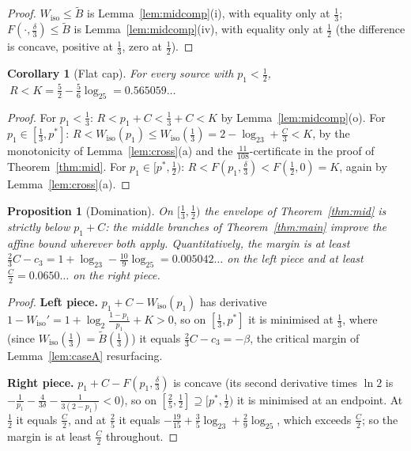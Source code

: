 \documentclass[journal]{IEEEtran}
\newtheorem{proposition}{Proposition}
\newtheorem{corollary}{Corollary}
\theoremstyle{definition}
\newcommand{\lgg}{\log_2}
\newcommand{\CC}{C}
\newcommand{\cthree}{c_3}
\begin{document}
\begin{proof}
$W_{\mathrm{iso}}\le\tilde B$ is Lemma~\ref{lem:midcomp}(i), with equality
only at $\tfrac13$; $F(\cdot,\tfrac\delta3)\le\tilde B$ is
Lemma~\ref{lem:midcomp}(iv), with equality only at $\tfrac12$ (the difference
is concave, positive at $\tfrac13$, zero at $\tfrac12$).
\end{proof}

\begin{corollary}[Flat cap]\label{cor:kcap}
For every source with $p_1<\tfrac12$,
$\ R<K=\tfrac52-\tfrac56\lgg5=0.565059\ldots$
\end{corollary}

\begin{proof}
For $p_1<\tfrac13$: $R<p_1+\CC<\tfrac13+\CC<K$ by
Lemma~\ref{lem:midcomp}(o). For $p_1\in[\tfrac13,p^*]$:
$R<W_{\mathrm{iso}}(p_1)\le W_{\mathrm{iso}}(\tfrac13)
=2-\lgg3+\tfrac{\CC}3<K$, by the monotonicity of
Lemma~\ref{lem:cross}(a) and the $\tfrac{11}{108}$-certificate in the proof
of Theorem~\ref{thm:mid}. For $p_1\in[p^*,\tfrac12)$:
$R<F(p_1,\tfrac\delta3)<F(\tfrac12,0)=K$, again by
Lemma~\ref{lem:cross}(a).
\end{proof}

\begin{proposition}[Domination]\label{prop:dom}
On $[\tfrac13,\tfrac12)$ the envelope of Theorem~\ref{thm:mid} is strictly
below $p_1+\CC$: the middle branches of Theorem~\ref{thm:main} improve the
affine bound wherever both apply. Quantitatively, the margin is at least
$\tfrac23\CC-\cthree=1+\lgg3-\tfrac{10}9\lgg5=0.005042\ldots$ on the left
piece and at least $\tfrac{\CC}2=0.0650\ldots$ on the right piece.
\end{proposition}

\begin{proof}
\textbf{Left piece.} $p_1+\CC-W_{\mathrm{iso}}(p_1)$ has derivative
$1-W_{\mathrm{iso}}'=1+\lgg\tfrac{1-p_1}{p_1}+K>0$, so on $[\tfrac13,p^*]$ it
is minimised at $\tfrac13$, where (since
$W_{\mathrm{iso}}(\tfrac13)=\tilde B(\tfrac13)$) it equals
$\tfrac23\CC-\cthree=-\beta$, the critical margin of Lemma~\ref{lem:caseA}
resurfacing.

\textbf{Right piece.} $p_1+\CC-F(p_1,\tfrac\delta3)$ is concave (its second
derivative times $\ln2$ is $-\tfrac1{p_1}-\tfrac4{3\delta}
-\tfrac1{3(2-p_1)}<0$), so on $[\tfrac25,\tfrac12]\supseteq[p^*,\tfrac12)$ it
is minimised at an endpoint. At $\tfrac12$ it equals $\tfrac{\CC}2$, and at
$\tfrac25$ it equals $-\tfrac{19}{15}+\tfrac35\lgg3+\tfrac29\lgg5$, which
exceeds $\tfrac{\CC}2$; so the margin is at least $\tfrac{\CC}2$ throughout.
\end{proof}
\end{document}
